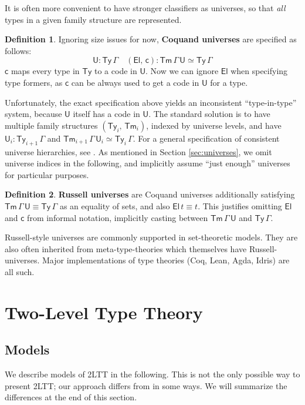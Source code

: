 \documentclass[12pt,a4paper,twoside,openany]{book}
\theoremstyle{remark}
\theoremstyle{definition}
\newtheorem{mydefinition}{Definition}
\theoremstyle{theorem}
\newcommand{\ms}[1]{\mathsf{#1}}
\newcommand{\Tm}{\mathsf{Tm}}
\newcommand{\Ty}{\mathsf{Ty}}
\newcommand{\U}{\mathsf{U}}
\newcommand{\El}{\mathsf{El}}
\begin{document}
It is often more convenient to have stronger classifiers as universes, so that
\emph{all} types in a given family structure are represented.

\begin{mydefinition}
Ignoring size issues for now, \textbf{Coquand universes}
\cite{coquand2018canonicity} are specified as follows:
\[
  \U : \Ty\,\Gamma\hspace{1em} (\El,\,\ms{c}) : \Tm\,\Gamma\,\U \simeq \Ty\,\Gamma
\]
$\ms{c}$ maps every type in $\Ty$ to a code in $\U$. Now we can ignore $\El$
when specifying type formers, as $\ms{c}$ can be always used to get a code in
$\U$ for a type.
\end{mydefinition}

Unfortunately, the exact specification above yields an inconsistent
``type-in-type'' system, because $\U$ itself has a code in $\U$. The standard
solution is to have multiple family structures $(\Ty_i,\,\Tm_i)$, indexed by
universe levels, and have $\U_i : \Ty_{i + 1}\,\Gamma$ and
$\Tm_{i+1}\,\Gamma\,\U_i \simeq \Ty_i\,\Gamma$. For a general specification of
consistent universe hierarchies, see \cite{kovacs2021generalized}. As mentioned in Section
\ref{sec:universes}, we omit universe indices in the following, and implicitly
assume ``just enough'' universes for particular purposes.

\begin{mydefinition}
\textbf{Russell universes} are Coquand universes additionally satisfying
$\Tm\,\Gamma\,\U \equiv \Ty\,\Gamma$ as an equality of sets, and also $\ms{El}\,t \equiv
t$. This justifies omitting $\El$ and $\ms{c}$ from informal notation,
implicitly casting between $\Tm\,\Gamma\,\U$ and $\Ty\,\Gamma$.
\end{mydefinition}
Russell-style universes are commonly supported in set-theoretic models. They are
also often inherited from meta-type-theories which themselves have
Russell-universes. Major implementations of type theories (Coq, Lean, Agda,
Idris) are all such.


\section{Two-Level Type Theory}

\subsection{Models}

We describe models of 2LTT in the following. This is not the only possible way
to present 2LTT; our approach differs from \cite{twolevel} in some ways. We will summarize
the differences at the end of this section.
\end{document}
